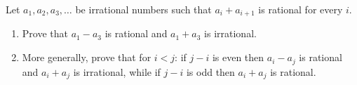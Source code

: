 Let $a_1,a_2,a_3,\dots$ be irrational numbers such that $a_i+a_{i+1}$ is rational for every $i$.
\begin{enumerate}
\item[(a)] Prove that $a_1-a_3$ is rational and $a_1+a_3$ is irrational.
\item[(b)] More generally, prove that for $i<j$: if $j-i$ is even then $a_i-a_j$ is rational and $a_i+a_j$ is irrational, while if $j-i$ is odd then $a_i+a_j$ is rational.
\end{enumerate}
